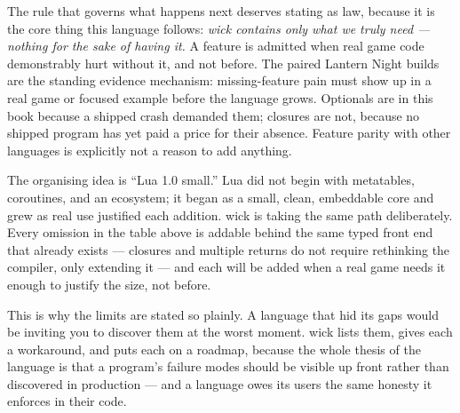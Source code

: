 The rule that governs what happens next deserves stating as law, because
it is the core thing this language follows: \emph{wick contains only what
we truly need --- nothing for the sake of having it.} A feature is
admitted when real game code demonstrably hurt without it, and not
before. The paired Lantern Night builds are the standing evidence mechanism:
missing-feature pain must show up in a real game or focused example before
the language grows. Optionals are in this book because a shipped crash
demanded them; closures are not, because no shipped program has yet paid
a price for their absence. Feature parity with other languages is
explicitly not a reason to add anything.


The organising idea is ``Lua 1.0 small.'' Lua did not begin with metatables,
coroutines, and an ecosystem; it began as a small, clean, embeddable core and
grew as real use justified each addition. wick is taking the same path
deliberately. Every omission in the table above is addable behind the same
typed front end that already exists --- closures and multiple returns
do not require rethinking the compiler, only extending it --- and each will be
added when a real game needs it enough to justify the size, not before.

This is why the limits are stated so plainly. A language that hid its gaps
would be inviting you to discover them at the worst moment. wick lists them,
gives each a workaround, and puts each on a roadmap, because the whole thesis
of the language is that a program's failure modes should be visible up front
rather than discovered in production --- and a language owes its users the same
honesty it enforces in their code.
